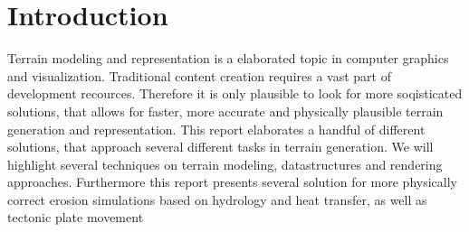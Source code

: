 \section{Introduction}
Terrain modeling and representation is a elaborated topic in computer graphics and visualization. Traditional content creation requires a vast part of development recources. Therefore it is only plausible to look for more soqisticated solutions, that allows for faster, more accurate and physically plausible terrain generation and representation. This report elaborates a handful of different solutions, that approach several different tasks in terrain generation. 
We will highlight several techniques on terrain modeling, datastructures and rendering approaches. 
Furthermore this report presents several solution for more physically correct erosion simulations based on hydrology and heat transfer, as well as tectonic plate movement



